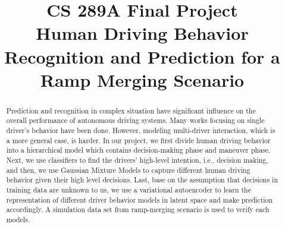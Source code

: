 \documentclass[conference]{IEEEtran}
\begin{document}
\title{CS 289A Final Project\\
Human Driving Behavior Recognition and Prediction for a Ramp Merging Scenario
}
\author{
\and
{}
\and
{}
\and
{}
}

\maketitle
\begin{abstract}
Prediction and recognition in complex situation have significant influence on the overall performance of autonomous driving systems. Many works focusing on single driver's behavior have been done. However, modeling multi-driver interaction, which is a more general case, is harder. In our project, we first divide human driving behavior into a hierarchical model which contains decision-making phase and maneuver phase. Next, we use classifiers to find the drivers' high-level intention, i.e., decision making, and then, we use Gaussian Mixture Models to capture different human driving behavior given their high level decisions. Last, base on the assumption that decisions in training data are unknown to us, we use a variational autoencoder to learn the representation of different driver behavior models in latent space and make prediction accordingly. A simulation data set from ramp-merging scenario is used to verify each models.    
\end{abstract}
\end{document}
